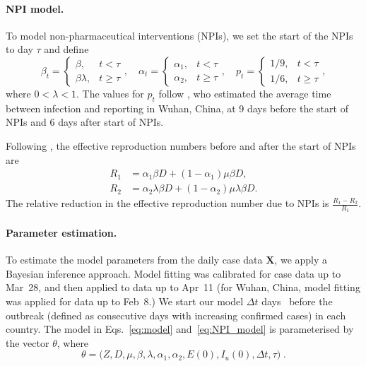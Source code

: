\documentclass[12pt]{extarticle}
\let\vec\mathbf
\begin{document}
\paragraph*{NPI model.}
To model non-pharmaceutical interventions (NPIs), we set the start of the NPIs to day $\tau$ and define
\begin{equation} \label{eq:NPI_model}
\beta_t = \begin{cases} 
  \beta, & t < \tau \\ 
  \beta \lambda, & t \ge \tau
\end{cases},
\quad
\alpha_t = \begin{cases} 
  \alpha_1, & t < \tau \\ 
  \alpha_2, & t \ge \tau
\end{cases},
\quad
p_t = \begin{cases} 
  1/9, & t < \tau \\ 
  1/6, & t \ge \tau
\end{cases},
\end{equation}
where $0 < \lambda < 1$.
The values for $p_t$ follow \citet{Li2020}, who estimated the average time between infection and reporting in Wuhan, China, at 9 days before the start of NPIs and 6 days after start of NPIs.

Following \citet{Li2020}, the effective reproduction numbers before and after the start of NPIs are
\begin{equation} \label{eq:Re}
\begin{aligned}
R_1 &= \alpha_1 \beta D + (1-\alpha_1) \mu \beta D, \\
R_2 &= \alpha_2 \lambda \beta D + (1-\alpha_2) \mu \lambda \beta D.
\end{aligned}
\end{equation}
The relative reduction in the effective reproduction number due to NPIs is $\frac{R_1 - R_2}{R_1}$.



\paragraph*{Parameter estimation.}
To estimate the model parameters from the daily case data $\vec{X}$, we apply a Bayesian inference approach.
Model fitting was calibrated for case data up to Mar~28, and then applied to data up to Apr~11 (for Wuhan, China, model fitting was applied for data up to Feb~8.)
We start our model $\Delta t$ days~\citep{Gatto2020} before the outbreak (defined as consecutive days with increasing confirmed cases) in each country.
The model in Eqs.~\ref{eq:model} and~\ref{eq:NPI_model} is parameterised by the vector $\theta$, where
\begin{equation} \label{eq:theta}
\theta=\Big(Z, D, \mu, \beta, \lambda, \alpha_1, \alpha_2, E(0), I_u(0), \Delta t, \tau \Big) \;.
\end{equation} 
\end{document}
